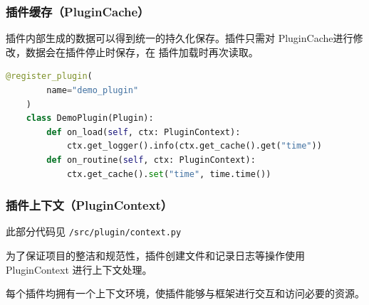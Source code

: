 \documentclass[14pt,a4paper,UTF8,twoside]{article}
\begin{document}
\subsubsection{插件缓存（PluginCache）}

插件内部生成的数据可以得到统一的持久化保存。插件只需对 PluginCache进行修改，数据会在插件停止时保存，在
插件加载时再次读取。

\begin{lstlisting}[language=python, title=插件缓存示例]
    @register_plugin(
        name="demo_plugin"
    )
    class DemoPlugin(Plugin):
        def on_load(self, ctx: PluginContext):
            ctx.get_logger().info(ctx.get_cache().get("time"))
        def on_routine(self, ctx: PluginContext):
            ctx.get_cache().set("time", time.time())
\end{lstlisting}

\subsubsection{插件上下文（PluginContext）}

\begin{mdframed}
    此部分代码见 \texttt{/src/plugin/context.py}
\end{mdframed}

\begin{note}
为了保证项目的整洁和规范性，插件创建文件和记录日志等操作使用 PluginContext 进行上下文处理。

每个插件均拥有一个上下文环境，使插件能够与框架进行交互和访问必要的资源。
\end{note}
\end{document}
